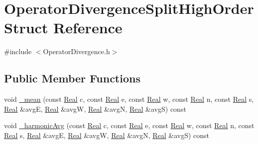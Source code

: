 \hypertarget{struct_operator_divergence_split_high_order}{}\section{Operator\+Divergence\+Split\+High\+Order Struct Reference}
\label{struct_operator_divergence_split_high_order}


{\ttfamily \#include $<$Operator\+Divergence.\+h$>$}

\subsection*{Public Member Functions}
\begin{DoxyCompactItemize}
\item 
void \hyperlink{struct_operator_divergence_split_high_order_ae7622c3be06fe1e484b8650fe126d940}{\+\_\+mean} (const \hyperlink{_h_d_f5_dumper_8h_a445a5f0e2a34c9d97d69a3c2d1957907}{Real} c, const \hyperlink{_h_d_f5_dumper_8h_a445a5f0e2a34c9d97d69a3c2d1957907}{Real} e, const \hyperlink{_h_d_f5_dumper_8h_a445a5f0e2a34c9d97d69a3c2d1957907}{Real} w, const \hyperlink{_h_d_f5_dumper_8h_a445a5f0e2a34c9d97d69a3c2d1957907}{Real} n, const \hyperlink{_h_d_f5_dumper_8h_a445a5f0e2a34c9d97d69a3c2d1957907}{Real} s, \hyperlink{_h_d_f5_dumper_8h_a445a5f0e2a34c9d97d69a3c2d1957907}{Real} \&avg\+E, \hyperlink{_h_d_f5_dumper_8h_a445a5f0e2a34c9d97d69a3c2d1957907}{Real} \&avg\+W, \hyperlink{_h_d_f5_dumper_8h_a445a5f0e2a34c9d97d69a3c2d1957907}{Real} \&avg\+N, \hyperlink{_h_d_f5_dumper_8h_a445a5f0e2a34c9d97d69a3c2d1957907}{Real} \&avg\+S) const 
\item 
void \hyperlink{struct_operator_divergence_split_high_order_a3b424419c1a002fed0ef9f74da3ce809}{\+\_\+harmonic\+Avg} (const \hyperlink{_h_d_f5_dumper_8h_a445a5f0e2a34c9d97d69a3c2d1957907}{Real} c, const \hyperlink{_h_d_f5_dumper_8h_a445a5f0e2a34c9d97d69a3c2d1957907}{Real} e, const \hyperlink{_h_d_f5_dumper_8h_a445a5f0e2a34c9d97d69a3c2d1957907}{Real} w, const \hyperlink{_h_d_f5_dumper_8h_a445a5f0e2a34c9d97d69a3c2d1957907}{Real} n, const \hyperlink{_h_d_f5_dumper_8h_a445a5f0e2a34c9d97d69a3c2d1957907}{Real} s, \hyperlink{_h_d_f5_dumper_8h_a445a5f0e2a34c9d97d69a3c2d1957907}{Real} \&avg\+E, \hyperlink{_h_d_f5_dumper_8h_a445a5f0e2a34c9d97d69a3c2d1957907}{Real} \&avg\+W, \hyperlink{_h_d_f5_dumper_8h_a445a5f0e2a34c9d97d69a3c2d1957907}{Real} \&avg\+N, \hyperlink{_h_d_f5_dumper_8h_a445a5f0e2a34c9d97d69a3c2d1957907}{Real} \&avg\+S) const 
\item 

\end{DoxyCompactItemize}
